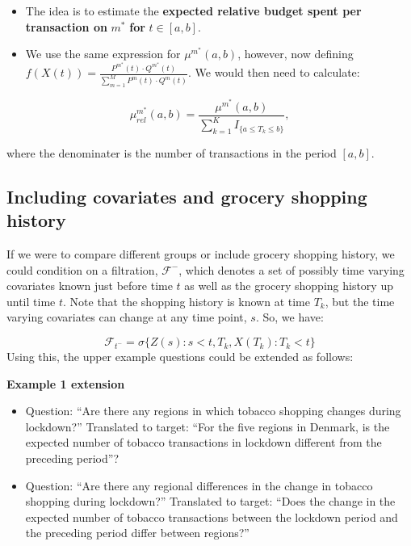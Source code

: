 \documentclass[
  11pt,
]{article}
\providecommand{\tightlist}{%
  \setlength{\itemsep}{0pt}\setlength{\parskip}{0pt}}
\begin{document}
\begin{itemize}
\tightlist
\item
  The idea is to estimate the \textbf{expected relative budget spent per
  transaction on} \(m^*\) \textbf{for} \(t\in[a,b]\).
\item
  We use the same expression for \(\mu^{m^*}(a,b)\), however, now
  defining
  \(f(X(t)) = \frac{P^{m^*}(t) \cdot Q^{m^*}(t)}{\sum_{m=1}^M P^m(t) \cdot Q^m(t)}\).
  We would then need to calculate:
\end{itemize}

\[
\mu_{rel}^{m^*}(a,b)= \frac{\mu^{m^*}(a, b)}{\sum_{k=1}^K I_{\{a \leq T_k \leq b \}}},
\]

where the denominater is the number of transactions in the period
\([a,b]\).

\hypertarget{including-covariates-and-grocery-shopping-history}{%
\subsection{Including covariates and grocery shopping
history}\label{including-covariates-and-grocery-shopping-history}}

If we were to compare different groups or include grocery shopping
history, we could condition on a filtration, \(\mathcal{F}^-\), which
denotes a set of possibly time varying covariates known just before time
\(t\) as well as the grocery shopping history up until time \(t\). Note
that the shopping history is known at time \(T_k\), but the time varying
covariates can change at any time point, \(s\). So, we have:

\[
\mathcal{F}_{t^-} = \sigma\{Z(s): s < t, T_k, X(T_k): T_k < t\}
\] Using this, the upper example questions could be extended as follows:

\textbf{Example 1 extension}

\begin{itemize}
\tightlist
\item
  Question: ``Are there any regions in which tobacco shopping changes
  during lockdown?'' Translated to target: ``For the five regions in
  Denmark, is the expected number of tobacco transactions in lockdown
  different from the preceding period''?
\item
  Question: ``Are there any regional differences in the change in
  tobacco shopping during lockdown?'' Translated to target: ``Does the
  change in the expected number of tobacco transactions between the
  lockdown period and the preceding period differ between regions?''
\end{itemize}
\end{document}
